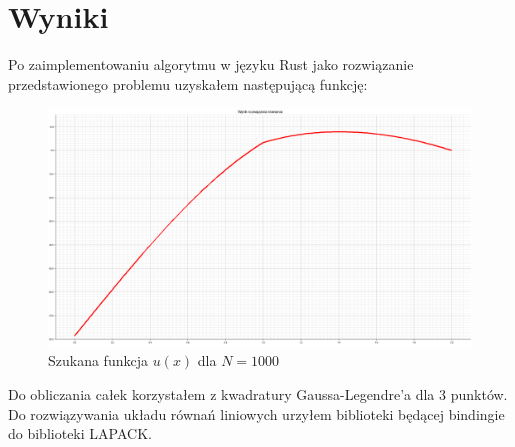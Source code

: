 \documentclass[a4paper]{article}
\begin{document}
\section{Wyniki}
Po zaimplementowaniu algorytmu w języku Rust jako rozwiązanie przedstawionego problemu
uzyskałem następującą funkcję:

\begin{figure}[H]
  \includegraphics[width=\textwidth]{equation_result.png}
  \caption{Szukana funkcja $u(x)$ dla $N=1000$}
\end{figure}


Do obliczania całek korzystałem z kwadratury Gaussa-Legendre'a dla 3 punktów. Do rozwiązywania
układu równań liniowych urzyłem biblioteki będącej bindingie do biblioteki LAPACK.
\end{document}

